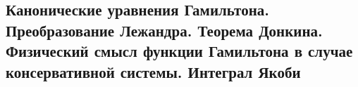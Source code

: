 

\subsection{Канонические уравнения Гамильтона. Преобразование Лежандра. Теорема Донкина. Физический смысл функции Гамильтона в случае консервативной системы. Интеграл Якоби}



